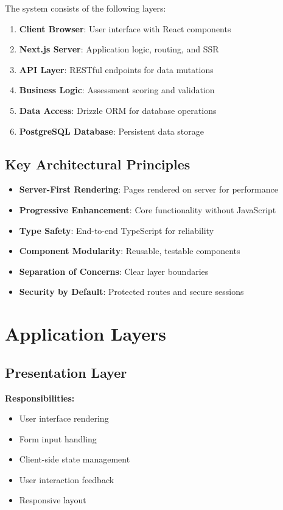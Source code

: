 \documentclass[12pt,a4paper]{report}
\begin{document}
The system consists of the following layers:

\begin{enumerate}
    \item \textbf{Client Browser}: User interface with React components
    \item \textbf{Next.js Server}: Application logic, routing, and SSR
    \item \textbf{API Layer}: RESTful endpoints for data mutations
    \item \textbf{Business Logic}: Assessment scoring and validation
    \item \textbf{Data Access}: Drizzle ORM for database operations
    \item \textbf{PostgreSQL Database}: Persistent data storage
\end{enumerate}

\subsection{Key Architectural Principles}

\begin{itemize}
    \item \textbf{Server-First Rendering}: Pages rendered on server for performance
    \item \textbf{Progressive Enhancement}: Core functionality without JavaScript
    \item \textbf{Type Safety}: End-to-end TypeScript for reliability
    \item \textbf{Component Modularity}: Reusable, testable components
    \item \textbf{Separation of Concerns}: Clear layer boundaries
    \item \textbf{Security by Default}: Protected routes and secure sessions
\end{itemize}

\section{Application Layers}

\subsection{Presentation Layer}

\textbf{Responsibilities:}
\begin{itemize}
    \item User interface rendering
    \item Form input handling
    \item Client-side state management
    \item User interaction feedback
    \item Responsive layout
\end{itemize}
\end{document}

